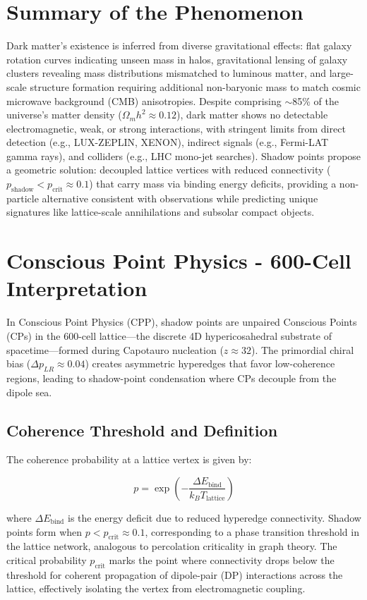 \documentclass[11pt]{article}
\begin{document}
\section{Summary of the Phenomenon}
Dark matter's existence is inferred from diverse gravitational effects: flat galaxy rotation curves indicating unseen mass in halos, gravitational lensing of galaxy clusters revealing mass distributions mismatched to luminous matter, and large-scale structure formation requiring additional non-baryonic mass to match cosmic microwave background (CMB) anisotropies. Despite comprising $\sim$85\% of the universe's matter density ($\Omega_m h^2 \approx 0.12$), dark matter shows no detectable electromagnetic, weak, or strong interactions, with stringent limits from direct detection (e.g., LUX-ZEPLIN, XENON), indirect signals (e.g., Fermi-LAT gamma rays), and colliders (e.g., LHC mono-jet searches). Shadow points propose a geometric solution: decoupled lattice vertices with reduced connectivity ($p_{\text{shadow}} < p_{\text{crit}} \approx 0.1$) that carry mass via binding energy deficits, providing a non-particle alternative consistent with observations while predicting unique signatures like lattice-scale annihilations and subsolar compact objects.

\section{Conscious Point Physics - 600-Cell Interpretation}
In Conscious Point Physics (CPP), shadow points are unpaired Conscious Points (CPs) in the 600-cell lattice—the discrete 4D hypericosahedral substrate of spacetime—formed during Capotauro nucleation ($z \approx 32$). The primordial chiral bias ($\Delta p_{LR} \approx 0.04$) creates asymmetric hyperedges that favor low-coherence regions, leading to shadow-point condensation where CPs decouple from the dipole sea.

\subsection{Coherence Threshold and Definition}
The coherence probability at a lattice vertex is given by:

\[
p = \exp\left( -\frac{\Delta E_{\text{bind}}}{k_B T_{\text{lattice}}} \right)
\]

where $\Delta E_{\text{bind}}$ is the energy deficit due to reduced hyperedge connectivity. Shadow points form when $p < p_{\text{crit}} \approx 0.1$, corresponding to a phase transition threshold in the lattice network, analogous to percolation criticality in graph theory. The critical probability $p_{\text{crit}}$ marks the point where connectivity drops below the threshold for coherent propagation of dipole-pair (DP) interactions across the lattice, effectively isolating the vertex from electromagnetic coupling.
\end{document}
